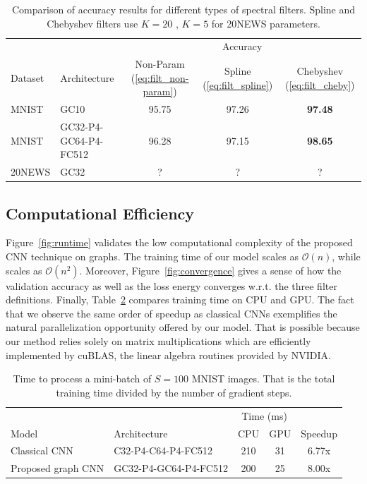 \documentclass{article}
\newcommand{\bO}{\mathcal{O}}
\newcommand{\figref}[1]{Figure~\ref{fig:#1}}
\newcommand{\tabref}[1]{Table~\ref{tab:#1}}
\newcommand{\eqnref}[1]{(\ref{eq:#1})}
\newcommand{\bruna}{art:BrunaZarembaSzlamLeCun13DLgraphs,
art:HenaffBrunaLeCun15DLgraphs}
\newcommand{\todo}[1]{{\color{red} #1 }}
\begin{document}
\begin{table}[h!] \centering
\begin{tabular}{llccc} \toprule
& & \multicolumn{3}{c}{Accuracy} \\
\cmidrule{3-5}
Dataset & Architecture & Non-Param \eqnref{filt_non-param} &
Spline \eqnref{filt_spline} \cite{\bruna} &
Chebyshev \eqnref{filt_cheby} \\
\midrule
MNIST & GC10 & 95.75 & 97.26 & \textbf{97.48} \\
MNIST & GC32-P4-GC64-P4-FC512 & 96.28 & 97.15 & \textbf{98.65} \\
20NEWS & GC32 & \todo{?} & \todo{?} & \todo{?} \\
\bottomrule \end{tabular}
\caption{Comparison of accuracy results for different types of spectral filters.
Spline and Chebyshev filters use \todo{$K=20$}, \todo{$K=5$ for 20NEWS}
parameters.} 
\label{tab:filters}
\end{table}








\subsection{Computational Efficiency}


\figref{runtime} validates the low computational complexity of the proposed CNN technique on graphs. The training time of our model scales as $\bO(n)$, while \cite{\bruna} scales as $\bO(n^2)$. Moreover,
\figref{convergence} gives a sense of how the validation accuracy as well as the
loss energy converges w.r.t. the three filter definitions. Finally,
\tabref{speedup} compares training time on CPU and GPU. The fact that we observe
the same order of speedup as classical CNNs exemplifies the natural
parallelization opportunity offered by our model. That is possible because our
method relies solely on matrix multiplications which are efficiently implemented
by cuBLAS, the linear algebra routines provided by NVIDIA.

\begin{table}[ht] \centering
\begin{tabular}{llccc} \toprule
& & \multicolumn{2}{c}{Time (ms)} & \\
Model & Architecture & CPU & GPU & Speedup \\
\midrule
Classical CNN & C32-P4-C64-P4-FC512 & 210 & 31 & 6.77x \\
Proposed graph CNN & GC32-P4-GC64-P4-FC512 & 200 & 25 & 8.00x \\
\bottomrule \end{tabular}
\caption{Time to process a mini-batch of $S=100$ MNIST images. That is the total
training time divided by the number of gradient steps.} 
\label{tab:speedup}
\end{table}
\end{document}

